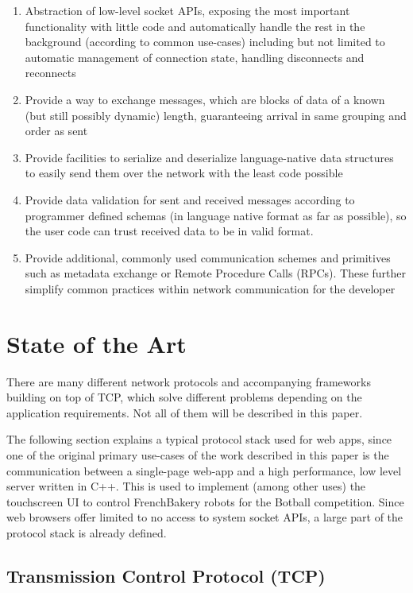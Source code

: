 \documentclass[conference]{IEEEtran}
\begin{document}
\begin{enumerate}
    \item Abstraction of low-level socket APIs, exposing the most important functionality with little code and automatically handle the rest in the background (according to common use-cases) including but not limited to automatic management of connection state, handling disconnects and reconnects
    \item Provide a way to exchange messages, which are blocks of data of a known (but still possibly dynamic) length, guaranteeing arrival in same grouping and order as sent
    \item Provide facilities to serialize and deserialize language-native data structures to easily send them over the network with the least code possible
    \item Provide data validation for sent and received messages according to programmer defined schemas (in language native format as far as possible), so the user code can trust received data to be in valid format.
    \item Provide additional, commonly used communication schemes and primitives such as metadata exchange or Remote Procedure Calls (RPCs). These further simplify common practices within network communication for the developer
\end{enumerate}


\section{State of the Art}

There are many different network protocols and accompanying frameworks building on top of TCP, which solve different problems depending on the application requirements. Not all of them will be described in this paper.

The following section explains a typical protocol stack used for web apps, since one of the original primary use-cases of the work described in this paper is the communication between a single-page web-app and a high performance, low level server written in C++. This is used to implement (among other uses) the touchscreen UI to control FrenchBakery robots for the Botball competition. Since web browsers offer limited to no access to system socket APIs, a large part of the protocol stack is already defined.


\subsection{Transmission Control Protocol (TCP)}
\end{document}
